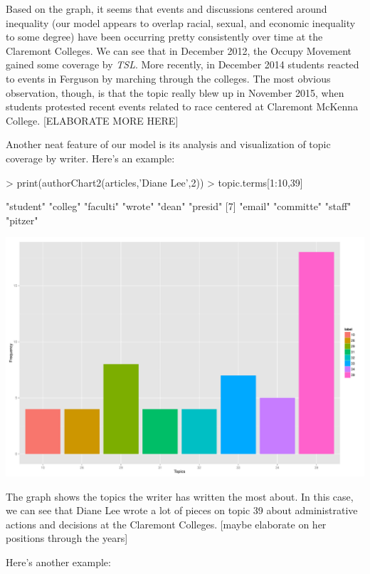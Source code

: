 \documentclass[a4paper]{article}
\begin{document}
Based on the graph, it seems that events and discussions centered around inequality (our model appears to overlap racial, sexual, and economic inequality to some degree) have been occurring pretty consistently over time at the Claremont Colleges. We can see that in December 2012, the Occupy Movement gained some coverage by \textit{TSL}. More recently, in December 2014 students reacted to events in Ferguson by marching through the colleges. The most obvious observation, though, is that the topic really blew up in November 2015, when students protested recent events related to race centered at Claremont McKenna College.
[ELABORATE MORE HERE]

Another neat feature of our model is its analysis and visualization of topic coverage by writer. Here's an example:

\begin{Schunk}
\begin{Sinput}
> print(authorChart2(articles,'Diane Lee',2))
> topic.terms[1:10,39]
\end{Sinput}
\begin{Soutput}
 [1] "student"  "colleg"   "faculti"  "wrote"    "dean"     "presid"  
 [7] "email"    "committe" "staff"    "pitzer"  
\end{Soutput}
\end{Schunk}
\includegraphics{FinalProject-010}

The graph shows the topics the writer has written the most about. In this case, we can see that Diane Lee wrote a lot of pieces on topic 39 about administrative actions and decisions at the Claremont Colleges.
[maybe elaborate on her positions through the years]

Here's another example:
\end{document}
